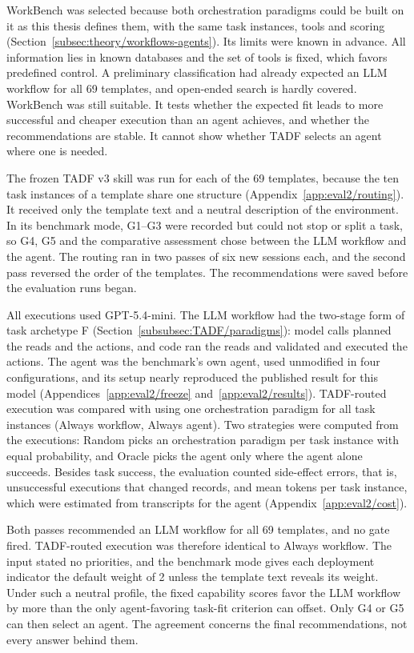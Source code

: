 WorkBench was selected because both orchestration paradigms could be built on it as this thesis defines them, with the same task instances, tools and scoring (Section~\ref{subsec:theory/workflows-agents}). Its limits were known in advance. All information lies in known databases and the set of tools is fixed, which favors predefined control. A preliminary classification had already expected an LLM workflow for all 69 templates, and open-ended search is hardly covered. WorkBench was still suitable. It tests whether the expected fit leads to more successful and cheaper execution than an agent achieves, and whether the recommendations are stable. It cannot show whether TADF selects an agent where one is needed.

The frozen TADF v3 skill was run for each of the 69 templates, because the ten task instances of a template share one structure (Appendix~\ref{app:eval2/routing}). It received only the template text and a neutral description of the environment. In its benchmark mode, G1--G3 were recorded but could not stop or split a task, so G4, G5 and the comparative assessment chose between the LLM workflow and the agent. The routing ran in two passes of six new sessions each, and the second pass reversed the order of the templates. The recommendations were saved before the evaluation runs began.

All executions used GPT-5.4-mini. The LLM workflow had the two-stage form of task archetype F (Section~\ref{subsubsec:TADF/paradigms}): model calls planned the reads and the actions, and code ran the reads and validated and executed the actions. The agent was the benchmark's own agent, used unmodified in four configurations, and its setup nearly reproduced the published result for this model (Appendices~\ref{app:eval2/freeze} and~\ref{app:eval2/results}). TADF-routed execution was compared with using one orchestration paradigm for all task instances (Always workflow, Always agent). Two strategies were computed from the executions: Random picks an orchestration paradigm per task instance with equal probability, and Oracle picks the agent only where the agent alone succeeds. Besides task success, the evaluation counted side-effect errors, that is, unsuccessful executions that changed records, and mean tokens per task instance, which were estimated from transcripts for the agent (Appendix~\ref{app:eval2/cost}).

Both passes recommended an LLM workflow for all 69 templates, and no gate fired. TADF-routed execution was therefore identical to Always workflow. The input stated no priorities, and the benchmark mode gives each deployment indicator the default weight of 2 unless the template text reveals its weight. Under such a neutral profile, the fixed capability scores favor the LLM workflow by more than the only agent-favoring task-fit criterion can offset. Only G4 or G5 can then select an agent. The agreement concerns the final recommendations, not every answer behind them.

